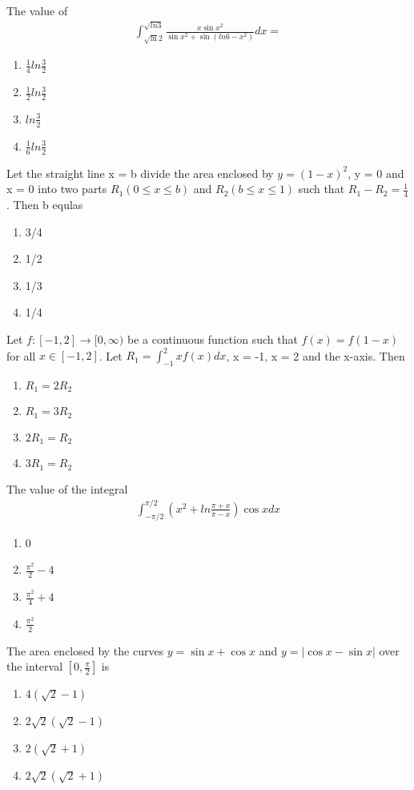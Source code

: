 \item The value of 
\begin{align*}
\int_{\sqrt\ln2}^{\sqrt{ln3}}\frac{x\sin x^2}{\sin x^2 + \sin(ln6 - x^2)}dx = 
\end{align*}
\begin{enumerate}
\item $\frac{1}{4}ln\frac{3}{2}$
\item $\frac{1}{2}ln\frac{3}{2}$
\item $ln\frac{3}{2}$
\item $\frac{1}{6}ln\frac{3}{2}$
\end{enumerate}

\item Let the straight line x = b divide the area enclosed by $y = (1 - x)^2$, y = 0 and x = 0 into two parts $R_1(0 \leq x \leq b)$ and $R_2(b \leq x \leq 1)$ such that $R_1 - R_2  = \frac{1}{4}$. Then b equlas
\begin{enumerate}
\item 3/4
\item 1/2
\item 1/3
\item 1/4
\end{enumerate}

\item Let $f: [-1, 2] \to [0, \infty)$ be a continuous function such that $f(x) = f(1 - x)$ for all $x \in [-1, 2]$. Let 
$R_1 = \int_{-1}^{2}xf(x)dx$, x = -1, x = 2 and the x-axis. Then
\begin{enumerate}
\item $R_1 = 2R_2$
\item $R_1 = 3R_2$
\item $2R_1 = R_2$
\item $3R_1 = R_2$
\end{enumerate}

\item The value of the integral
\begin{align*}
\int_{-\pi/2}^{\pi/2}(x^2 + ln\frac{\pi + x}{\pi - x})\cos x dx
\end{align*}
\begin{enumerate}
\item 0
\item $\frac{\pi^2}{2} - 4$
\item $\frac{\pi^2}{4} + 4$
\item $\frac{\pi^2}{2}$
\end{enumerate}

\item The area enclosed by the curves $y = \sin x + \cos x$ and $y = |\cos x - \sin x|$ over the interval $[0, \frac{\pi}{2}]$ is
\begin{enumerate}
\item $4(\sqrt{2} - 1)$
\item $2\sqrt{2}(\sqrt{2} - 1)$
\item $2(\sqrt{2} + 1)$
\item $2\sqrt{2}(\sqrt{2} + 1)$
\end{enumerate}

